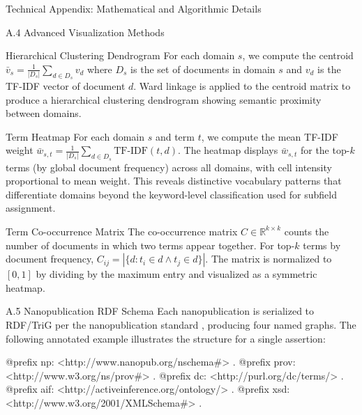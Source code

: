 \documentclass[
  ignorenonframetext,
]{beamer}
\newenvironment{Shaded}{}{}
\newcommand{\NormalTok}[1]{#1}
\begin{document}
\begin{frame}[fragile]{Technical Appendix: Mathematical and Algorithmic
Details \label{sec:technical_appendix}}
\begin{block}{A.4 Advanced Visualization Methods}
\begin{block}{Hierarchical Clustering Dendrogram}
\protect{}\label{hierarchical-clustering-dendrogram}
For each domain \(s\), we compute the centroid
\(\bar{v}_s = \frac{1}{|D_s|} \sum_{d \in D_s} v_d\) where \(D_s\) is
the set of documents in domain \(s\) and \(v_d\) is the TF-IDF vector of
document \(d\). Ward linkage is applied to the centroid matrix to
produce a hierarchical clustering dendrogram showing semantic proximity
between domains.
\end{block}

\begin{block}{Term Heatmap}
\protect{}\label{term-heatmap}
For each domain \(s\) and term \(t\), we compute the mean TF-IDF weight
\(\bar{w}_{s,t} = \frac{1}{|D_s|} \sum_{d \in D_s} \text{TF-IDF}(t, d)\).
The heatmap displays \(\bar{w}_{s,t}\) for the top-\(k\) terms (by
global document frequency) across all domains, with cell intensity
proportional to mean weight. This reveals distinctive vocabulary
patterns that differentiate domains beyond the keyword-level
classification used for subfield assignment.
\end{block}

\begin{block}{Term Co-occurrence Matrix}
\protect{}\label{term-co-occurrence-matrix}
The co-occurrence matrix \(C \in \mathbb{R}^{k \times k}\) counts the
number of documents in which two terms appear together. For top-\(k\)
terms by document frequency,
\(C_{ij} = |\{d : t_i \in d \land t_j \in d\}|\). The matrix is
normalized to \([0, 1]\) by dividing by the maximum entry and visualized
as a symmetric heatmap.
\end{block}
\end{block}

\begin{block}{A.5 Nanopublication RDF Schema}
\protect{}\label{a.5-nanopublication-rdf-schema}
Each nanopublication is serialized to RDF/TriG per the nanopublication
standard \citep{groth2010anatomy, kuhn2016decentralized}, producing four
named graphs. The following annotated example illustrates the structure
for a single assertion:

\begin{Shaded}
\begin{Highlighting}[]
\NormalTok{@prefix np: \textless{}http://www.nanopub.org/nschema\#\textgreater{} .}
\NormalTok{@prefix prov: \textless{}http://www.w3.org/ns/prov\#\textgreater{} .}
\NormalTok{@prefix dc: \textless{}http://purl.org/dc/terms/\textgreater{} .}
\NormalTok{@prefix aif: \textless{}http://activeinference.org/ontology/\textgreater{} .}
\NormalTok{@prefix xsd: \textless{}http://www.w3.org/2001/XMLSchema\#\textgreater{} .}


\end{Highlighting}
\end{Shaded}
\end{block}
\end{frame}
\end{document}
